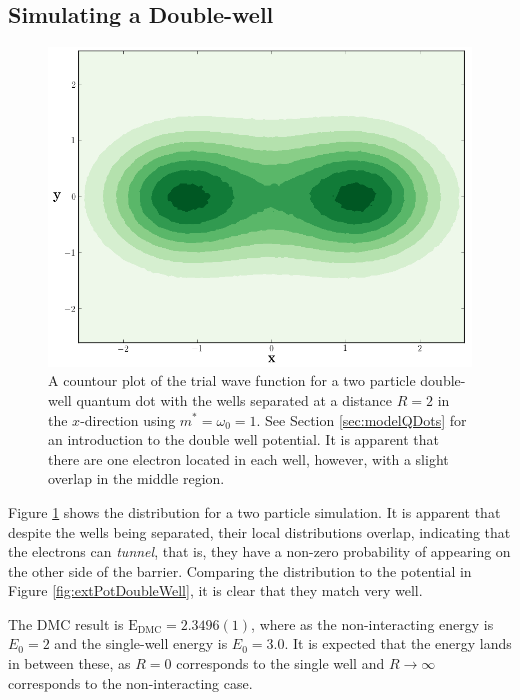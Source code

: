 \subsection{Simulating a Double-well}

\begin{figure}[h]
 \begin{center}
 \includegraphics[scale=0.35]{../Graphics/DoubleWell.png}
  \caption{A countour plot of the trial wave function for a two particle double-well quantum dot with the wells separated at a distance $R = 2$ in the $x$-direction using $m^\ast = \omega_0 = 1$. See Section \ref{sec:modelQDots} for an introduction to the double well potential. It is apparent that there are one electron located in each well, however, with a slight overlap in the middle region.}
  \label{fig:doubleWell}
 \end{center}
\end{figure}
\captionsetup[subfloat]{labelformat=parens}

Figure \ref{fig:doubleWell} shows the distribution for a two particle simulation. It is apparent that despite the wells being separated, their local distributions overlap, indicating that the electrons can \textit{tunnel}, that is, they have a non-zero probability of appearing on the other side of the barrier. Comparing the distribution to the potential in Figure \ref{fig:extPotDoubleWell}, it is clear that they match very well.

The DMC result is $\mathrm{E_{DMC}} = 2.3496(1)$, where as the non-interacting energy is $E_0 = 2$ and the single-well energy is $E_0=3.0$. It is expected that the energy lands in between these, as $R=0$ corresponds to the single well and $R\to\infty$ corresponds to the non-interacting case. 
